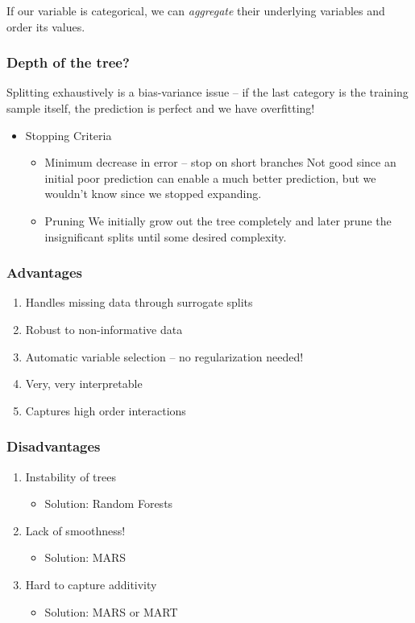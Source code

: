 \documentclass[11pt]{article}
\begin{document}
\begin{itemize}
\begin{itemize}
If our variable is categorical, we can \emph{aggregate} their underlying variables and order its values.
\end{itemize}

\subsubsection*{Depth of the tree?}
\label{sec-4-4-2}
Splitting exhaustively is a bias-variance issue -- if the last category is the training sample itself, the prediction is perfect and we have overfitting!

\begin{itemize}
\item Stopping Criteria
\label{sec-4-4-2-1}

\begin{itemize}
\item Minimum decrease in error -- stop on short branches
\label{sec-4-4-2-1-1}
Not good since an initial poor prediction can enable a much better prediction, but we wouldn't know since we stopped expanding.

\item Pruning
\label{sec-4-4-2-1-2}
We initially grow out the tree completely and later prune the insignificant splits until some desired complexity.
\end{itemize}
\end{itemize}

\subsubsection*{Advantages}
\label{sec-4-4-3}
\begin{enumerate}
\item Handles missing data through surrogate splits
\item Robust to non-informative data
\item Automatic variable selection -- no regularization needed!
\item Very, very interpretable
\item Captures high order interactions
\end{enumerate}

\subsubsection*{Disadvantages}
\label{sec-4-4-4}
\begin{enumerate}
\item Instability of trees
\begin{itemize}
\item Solution: Random Forests
\end{itemize}
\item Lack of smoothness!
\begin{itemize}
\item Solution: MARS
\end{itemize}
\item Hard to capture additivity
\begin{itemize}
\item Solution: MARS or MART
\end{itemize}
\end{enumerate}

\end{itemize}
\end{document}
